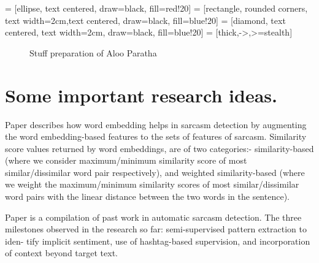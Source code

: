  = [ellipse, text centered, draw=black, fill=red!20]
 = [rectangle, rounded corners, text width=2cm,text centered, draw=black, fill=blue!20]
 = [diamond, text centered, text width=2cm, draw=black, fill=blue!20]
 = [thick,->,>=stealth]

\begin{figure}[h!]
\begin{center}
\end{center}
\caption{Stuff preparation of Aloo Paratha}
\end{figure}

\section{Some important research ideas.}
Paper\cite{arxivPreprint} describes how word embedding helps in sarcasm detection by augmenting
the word embedding-based features to the sets of features of sarcasm. Similarity score
values returned by word embeddings, are of two categories:- similarity-based (where we consider maximum/minimum similarity score of most similar/dissimilar word pair
respectively), and weighted similarity-based (where we weight the maximum/minimum
similarity scores of most similar/dissimilar word pairs with the linear distance between
the two words in the sentence).

Paper\cite{acmSurvey} is a compilation of past work in automatic sarcasm detection. The three
milestones observed in the research so far: semi-supervised pattern extraction to iden-
tify implicit sentiment, use of hashtag-based supervision, and incorporation of context
beyond target text.

